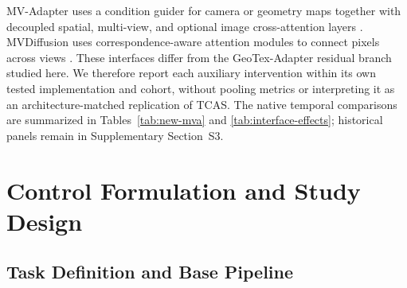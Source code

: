 \documentclass[times,twocolumn,final]{elsarticle}
\providecommand{\DIFadd}[1]{{\protect\color{blue} \sf #1}} %
\providecommand{\DIFaddbegin}{} %
\providecommand{\DIFaddend}{} %
\providecommand{\DIFdelbegin}{} %
\providecommand{\DIFdelend}{} %
\begin{document}
\DIFadd{MV-Adapter uses a condition guider for camera or geometry maps together with decoupled spatial, multi-view, and optional image cross-attention layers \cite{huang2024mvadapter}. MVDiffusion uses correspondence-aware attention modules to connect pixels across views \cite{tang2023mvdiffusion}. These interfaces differ from the GeoTex-Adapter residual branch studied here. We therefore report each auxiliary intervention within its own tested implementation and cohort, without pooling metrics or interpreting it as an architecture-matched replication of TCAS. The native temporal comparisons are summarized in Tables~\ref{tab:new-mva} and \ref{tab:interface-effects}; historical panels remain in Supplementary Section~S3}\DIFaddend .

\DIFdelbegin %
\DIFdelend \DIFaddbegin \section{Control Formulation and Study Design}
\DIFaddend \label{sec:method}

\subsection{Task Definition and Base Pipeline}
\label{subsec:task}
\end{document}

